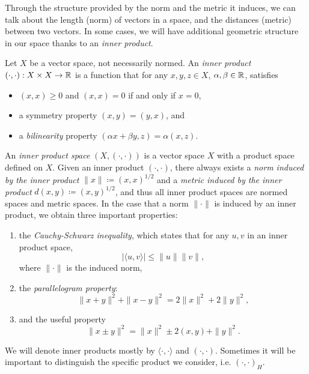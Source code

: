 Through the structure provided by the norm and the metric it induces, we can talk about the length (norm) of vectors in a space, and the distances (metric) between two vectors. In some cases, we will have additional geometric structure in our space thanks to an \emph{inner product}. 
\begin{definition}
    Let $X$ be a vector space, not necessarily normed. An \emph{inner product} $(\cdot,\cdot):X\times X\to \mathbb{R}$ is a function that for any $x,y,z\in X$, $\alpha, \beta\in\mathbb{R}$, satisfies
    \begin{itemize}
        \item $(x,x)\geq 0$ and $(x,x)=0$ if and only if $x=0$, 
        \item a symmetry property $(x,y)=(y,x)$, and
        \item a \emph{bilinearity} property $(\alpha x+\beta y, z)=\alpha(x,z)$.
    \end{itemize}
    An \emph{inner product space} $(X,(\cdot,\cdot))$ is a vector space $X$ with a product space defined on $X$. Given an inner product $(\cdot,\cdot)$, there always exists a \emph{norm induced by the inner product} $\|x\|\coloneqq (x,x)^{1/2}$ and a \emph{metric induced by the inner product} $d(x,y)\coloneqq (x,y)^{1/2}$, and thus all inner product spaces are normed spaces and metric spaces. In the case that a norm $\|\cdot\|$ is induced by an inner product, we obtain three important properties: 
    \begin{enumerate}
        \item the \emph{Cauchy-Schwarz inequality}, which states that for any $u,v$ in an inner product space, 
            \begin{equation}
                |\langle u, v\rangle| \leq \|u\| \|v\|,
            \end{equation}
            where $\|\cdot\|$ is the induced norm,
        \item the \emph{parallelogram property}:
            \begin{equation}
                \|x+y\|^2 + \|x-y\|^2 = 2\|x\|^2 + 2\|y\|^2,
            \end{equation}
        \item and the useful property 
            \begin{equation}
                \|x\pm y\|^2 = \|x\|^2 \pm 2(x,y) + \|y\|^2.
            \end{equation}
    \end{enumerate}
    We will denote inner products mostly by $\langle\cdot, \cdot\rangle$ and $(\cdot, \cdot)$. Sometimes it will be important to distinguish the specific product we consider, i.e. $(\cdot, \cdot)_H$. 
\end{definition}

